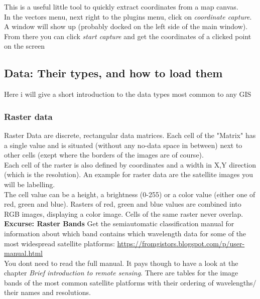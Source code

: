 \documentclass[12pt,a4paper]{scrartcl}
\begin{document}
This is a useful little tool to quickly extract coordinates from a map canvas. \\
In the vectors menu, next right to the plugins menu, click on \textit{coordinate capture}. \\
A window will show up (probably docked on the left side of the main window). \\
From there you can click \textit{start capture} and get the coordinates of a clicked point on the screen

\subsection{Data: Their types, and how to load them}

Here i will give a short introduction to the data types most common to any GIS

\subsubsection{Raster data}
\label{rastabands}

Raster Data are discrete, rectangular data matrices.
Each cell of the "Matrix" has a single value and is situated (without any no-data space in between) next to other cells (exept where the borders of the images are of course). \\
Each cell of the raster is also defined by coordinates and a width in X,Y direction (which is the resolution).
An example for raster data are the satellite images you will be labelling. \\

The cell value can be a height, a brightness (0-255) or a color value (either one of red, green and blue).
Rasters of red, green and blue values are combined into RGB images, displaying a color image.  
Cells of the same raster never overlap. \\

\textbf{Excurse: Raster Bands} \newline
Get the semiautomatic classification manual for information about which band contains which wavelength data for 
some of the most widespread satellite platforms: 
\url{https://fromgistors.blogspot.com/p/user-manual.html}\\

You dont need to read the full manual. 
It pays though to have a look at the chapter \textit{Brief introduction to remote sensing}.
There are tables for the image bands of the most common satellite platforms with their ordering of wavelengths/ their names and resolutions.
\end{document}
